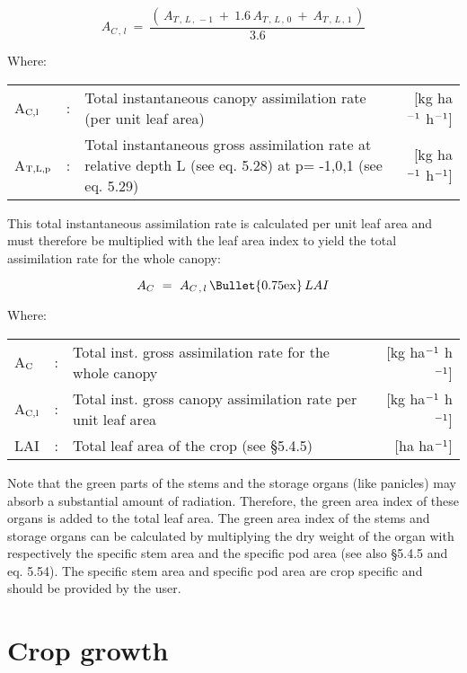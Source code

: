 \begin{equation}
A _{C\, ,\, l} ~=~{\frac{(\, A _{T\, ,\, L\, ,\, -1} ~+~1.6\, A _{T\, ,\, L\, ,\, 0} ~+~A _{T\, ,\, L\, ,\, 1\, } )}{3.6}}
\end{equation}

Where:\\
\begin{tabularx}{\textwidth}{llXr}
A$_{{\rm C,l}}$ &:& Total instantaneous canopy assimi\-la\-tion 
   rate (per unit leaf area)    &    [kg ha$^{{\rm -1}}$ h$^{{\rm -1}}$]\\
A$_{{\rm T,L,p}}$ &:& Total instantaneous gross assimilation rate at relative 
   depth L (see eq. 5.28) at p= -1,0,1 (see eq. 5.29)    &    [kg ha$^{{\rm -1}}$ h$^{{\rm -1}}$]\\
\end{tabularx}

This total instantaneous assimilation rate is calculated per unit leaf area and must
therefore be multiplied with the leaf area index to yield the total assimilation rate for the
whole canopy:

\begin{equation}
A _{C} ~=~ A _{C\, ,\, l} \, {\rm \Bullet{0.75ex}}\, LAI
\end{equation}

 
Where:\\
\begin{tabularx}{\textwidth}{llXr}
A$_{{\rm C}}$ &:& Total inst. gross assimila\-tion rate for
   the whole canopy  &  [kg ha$^{{\rm -1}}$ h$^{{\rm -1}}$]\\
A$_{{\rm C,l}}$ &:& Total inst. gross canopy assimila\-tion rate 
   per unit leaf area &  [kg ha$^{{\rm -1}}$ h$^{{\rm -1}}$]\\
LAI &:& Total leaf area of the crop (see \S 5.4.5)  & [ha ha$^{{\rm -1}}$]\\
\end{tabularx}

Note that the green parts of the stems and the storage organs (like panicles) may absorb a
substan\-tial amount of radiation. Therefore, the green area index of these organs is added
to the total leaf area. The green area index of the stems and storage organs can be
calculated by multiplying the dry weight of the organ with respectively the specific stem
area and the specific pod area (see also \S 5.4.5 and eq. 5.54). The specific stem area and
specific pod area are crop specific and should be provided by the user.


\section{Crop growth}

